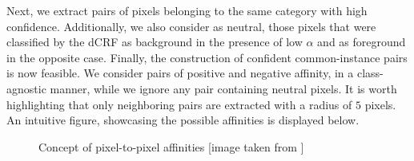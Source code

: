 \documentclass{article}
\begin{document}
Next, we extract pairs of pixels belonging to the same category with high confidence. Additionally, we also consider as neutral, those pixels that were classified by the dCRF as background in the presence of low $\alpha$ and as foreground in the opposite case. Finally, the construction of confident common-instance pairs is now feasible. We consider pairs of positive and negative affinity, in a class-agnostic manner, while we ignore any pair containing neutral pixels. It is worth highlighting that only neighboring pairs are extracted with a radius of $5$ pixels. An intuitive figure, showcasing the possible affinities is displayed below.

\begin{figure}[!h]   %
    \centering
    \caption{Concept of pixel-to-pixel affinities [image taken from \cite{ahn2018learning}]}
\end{figure}
\end{document}

